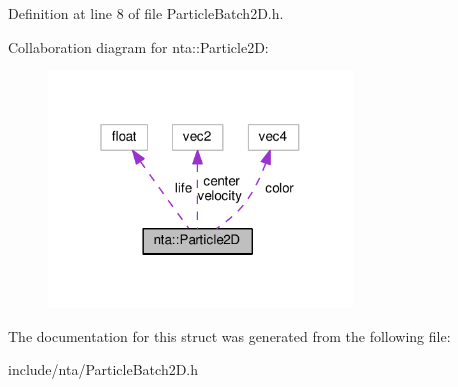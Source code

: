 Definition at line 8 of file Particle\+Batch2\+D.\+h.



Collaboration diagram for nta\+:\+:Particle2D\+:
\nopagebreak
\begin{figure}[H]
\begin{center}
\leavevmode
\includegraphics[width=229pt]{df/d87/structnta_1_1Particle2D__coll__graph}
\end{center}
\end{figure}


The documentation for this struct was generated from the following file\+:\begin{DoxyCompactItemize}
\item 
include/nta/Particle\+Batch2\+D.\+h\end{DoxyCompactItemize}
